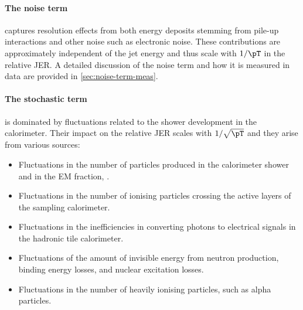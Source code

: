 \paragraph{The noise term} captures resolution effects from both energy deposits stemming from pile-up interactions and other noise such as electronic noise.
These contributions are approximately independent of the jet energy and thus scale with $1 / \pT$ in the relative JER. A detailed discussion of the noise term and how it is measured in data are provided in \cref{sec:noise-term-meas}.

\paragraph{The stochastic term} is dominated by fluctuations related to the shower development in the calorimeter. Their impact on the relative JER scales with $1 / \sqrt{\pT}$ and they arise from various sources:
\begin{itemize}
    \item Fluctuations in the number of particles produced in the calorimeter shower and in the EM fraction, \fEM.
    \item Fluctuations in the number of ionising particles crossing the active layers of the sampling calorimeter.
    \item Fluctuations in the inefficiencies in converting photons to electrical signals in the hadronic tile calorimeter.
    \item Fluctuations of the amount of invisible energy from neutron production, binding energy losses, and nuclear excitation losses.
    \item Fluctuations in the number of heavily ionising particles, such as alpha particles.
\end{itemize}

